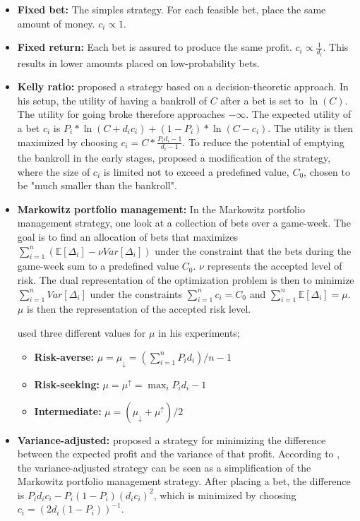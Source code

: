 \begin{itemize}
    \item \textbf{Fixed bet:} The simples strategy. For each feasible bet, place the same amount of money. $c_{i} \propto 1$.
    
    \item \textbf{Fixed return:} Each bet is assured to produce the same profit. $c_{i} \propto \frac{1}{d_{i}}$. This results in lower amounts placed on low-probability bets.
    
    \item \textbf{Kelly ratio:} \citet{bib:kelly-1956} proposed a strategy based on a decision-theoretic approach. In his setup, the utility of having a bankroll of $C$ after a bet is set to $\ln(C)$. The utility for going broke therefore approaches $- \infty$. The expected utility of a bet $c_{i}$ is $P_{i} * \ln(C + d_{i} c_{i}) + (1 - P_{i}) * \ln(C - c_{i})$. The utility is then maximized by choosing $c_{i} = C * \frac{P_{i} d_{i} - 1}{d_{i} - 1}$. To reduce the potential of emptying the bankroll in the early stages, \citet{bib:langseth-2013} proposed a modification of the strategy, where the size of $c_{i}$ is limited not to exceed a predefined value, $C_{0}$, chosen to be "much smaller than the bankroll".
    
    \item \textbf{Markowitz portfolio management:} In the Markowitz portfolio management strategy, one look at a collection of bets over a game-week. The goal is to find an allocation of bets that maximizes $\sum_{i=1}^{n} (\mathbb{E}[\Delta_{i}] - \nu Var[\Delta_{i}])$ under the constraint that the bets during the game-week sum to a predefined value $C_{0}$. $\nu$ represents the accepted level of risk. The dual representation of the optimization problem is then to minimize $\sum_{i=1}^{n} Var[\Delta_{i}]$ under the constraints $\sum_{i=1}^{n} c_{i} = C_{0}$ and $\sum_{i=1}^{n} \mathbb{E}[\Delta_{i}] = \mu$. $\mu$ is then the representation of the accepted risk level.
    
    \citet{bib:langseth-2013} used three different values for $\mu$ in his experiments;
    \begin{itemize}
        \item \textbf{Risk-averse:} $\mu = \mu_{\downarrow} = (\sum_{i=1}^{n} P_{i} d_{i}) / n - 1$
        \item \textbf{Risk-seeking:} $\mu = \mu^{\uparrow} = \max_{i} P_{i} d_{i} - 1$
        \item \textbf{Intermediate:} $\mu = (\mu_{\downarrow} + \mu^{\uparrow}) / 2$
    \end{itemize}
    
    \item \textbf{Variance-adjusted:} \citet{bib:rue-salvesen-2000} proposed a strategy for minimizing the difference between the expected profit and the variance of that profit. According to \citet{bib:langseth-2013}, the variance-adjusted strategy can be seen as a simplification of the Markowitz portfolio management strategy. After placing a bet, the difference is $P_{i} d_{i} c_{i} - P_{i}(1 - P_{i})(d_{i} c_{i})^{2}$, which is minimized by choosing $c_{i} = (2 d_{i} (1 - P_{i}))^{-1}$.
\end{itemize}
